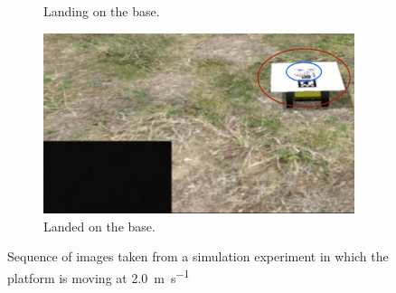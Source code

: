 \begin{figure}[!htbp]
\begin{subfigure}[b]{0.45\textwidth}
        \caption{Landing on the base.}
        \label{fig:four}
   \end{subfigure} \hfill
    \begin{subfigure}[b]{0.45\textwidth}
        \includegraphics[width=\textwidth]{img/landed3.jpg}
        \caption{Landed on the base.}
        \label{fig:five}
   \end{subfigure}
   
  \caption{Sequence of images taken from a simulation experiment in which the platform is moving at \SI{2.0}{\meter \per \second} }
  \label{fig:landing1}
\end{figure}

